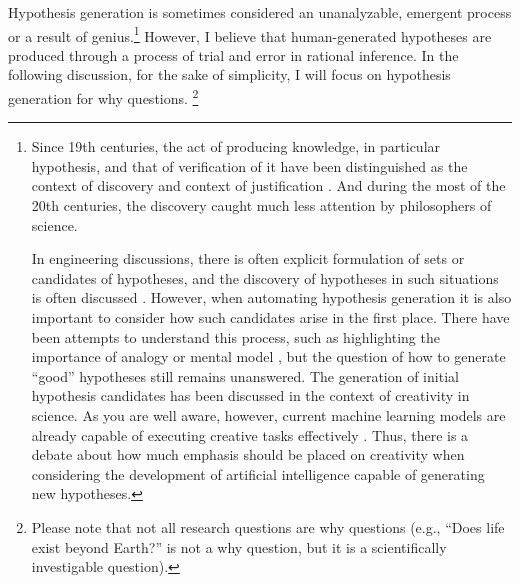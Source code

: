 Hypothesis generation is sometimes considered an unanalyzable, emergent process or a result of genius.\footnote{
Since 19th centuries, the act of producing knowledge, in particular hypothesis, and that of verification of it have been distinguished as the context of discovery and context of justification \cite{sep-scientific-discovery}. And during the most of the 20th centuries, the discovery caught much less attention by philosophers of science.

In engineering discussions, there is often explicit formulation of sets or candidates of hypotheses, and the discovery of hypotheses in such situations is often discussed \cite{simon1973does,kitano2021nobel,bengio2022ml4sci}. However, when automating hypothesis generation it is also important to consider how such candidates arise in the first place. There have been attempts to understand this process, such as highlighting the importance of analogy \cite{thagard1984conceptual} or mental model \cite{nersessian1999model}, but the question of how to generate ``good'' hypotheses still remains unanswered. The generation of initial hypothesis candidates has been discussed in the context of creativity in science. As you are well aware, however, current machine learning models are already capable of executing creative tasks effectively \cite{sep-creativity}. Thus, there is a debate about how much emphasis should be placed on creativity when considering the development of artificial intelligence capable of generating new hypotheses.
} However, I believe that human-generated hypotheses are produced through a process of trial and error in rational inference. In the following discussion, for the sake of simplicity, I will focus on hypothesis generation for why questions. \footnote{
Please note that not all research questions are why questions (e.g., ``Does life exist beyond Earth?'' is not a why question, but it is a scientifically investigable question).
}




